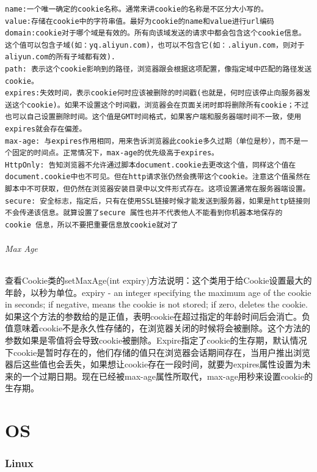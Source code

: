 \documentclass[letter]{book}
\begin{document}
\begin{lstlisting}
name:一个唯一确定的cookie名称。通常来讲cookie的名称是不区分大小写的。
value:存储在cookie中的字符串值。最好为cookie的name和value进行url编码
domain:cookie对于哪个域是有效的。所有向该域发送的请求中都会包含这个cookie信息。这个值可以包含子域(如：yq.aliyun.com)，也可以不包含它(如：.aliyun.com，则对于aliyun.com的所有子域都有效).
path: 表示这个cookie影响到的路径，浏览器跟会根据这项配置，像指定域中匹配的路径发送cookie。
expires:失效时间，表示cookie何时应该被删除的时间戳(也就是，何时应该停止向服务器发送这个cookie)。如果不设置这个时间戳，浏览器会在页面关闭时即将删除所有cookie；不过也可以自己设置删除时间。这个值是GMT时间格式，如果客户端和服务器端时间不一致，使用expires就会存在偏差。
max-age: 与expires作用相同，用来告诉浏览器此cookie多久过期（单位是秒），而不是一个固定的时间点。正常情况下，max-age的优先级高于expires。
HttpOnly: 告知浏览器不允许通过脚本document.cookie去更改这个值，同样这个值在document.cookie中也不可见。但在http请求张仍然会携带这个cookie。注意这个值虽然在脚本中不可获取，但仍然在浏览器安装目录中以文件形式存在。这项设置通常在服务器端设置。
secure: 安全标志，指定后，只有在使用SSL链接时候才能发送到服务器，如果是http链接则不会传递该信息。就算设置了secure 属性也并不代表他人不能看到你机器本地保存的 cookie 信息，所以不要把重要信息放cookie就对了
\end{lstlisting}

\paragraph{Max Age}查看Cookie类的setMaxAge(int expiry)方法说明：这个类用于给Cookie设置最大的年龄，以秒为单位。expiry - an integer specifying the maximum age of the cookie in seconds; if negative, means the cookie is not stored; if zero, deletes the cookie.如果这个方法的参数给的是正值，表明cookie在超过指定的年龄时间后会消亡。负值意味着cookie不是永久性存储的，在浏览器关闭的时候将会被删除。这个方法的参数如果是零值将会导致cookie被删除。Expire指定了cookie的生存期，默认情况下cookie是暂时存在的，他们存储的值只在浏览器会话期间存在，当用户推出浏览器后这些值也会丢失，如果想让cookie存在一段时间，就要为expires属性设置为未来的一个过期日期。现在已经被max-age属性所取代，max-age用秒来设置cookie的生存期。

\part{OS}

\section{Linux}
\end{document}
